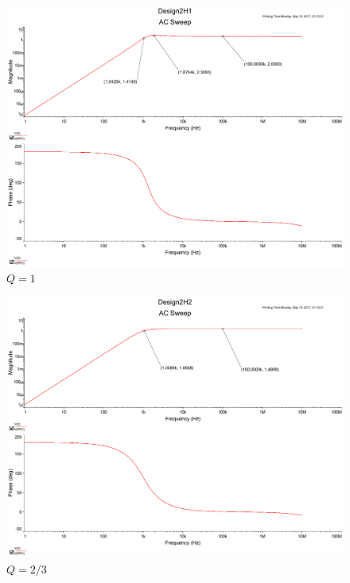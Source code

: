 \documentclass[UTF8,a4paper]{paper}
\begin{document}
\begin{multicols}{3}
\begin{figure}[H]
\centering
\includegraphics[width=\columnwidth]{2H1.pdf}
\caption{$Q=1$}
\label{HQ1}
\end{figure}
\begin{figure}[H]
\centering
\includegraphics[width=\columnwidth]{2H2_3.pdf}
\caption{$Q=2/3$}
\label{HQ23}
\end{figure}
\begin{figure}[H]
\centering

\end{figure}
\end{multicols}
\end{document}
